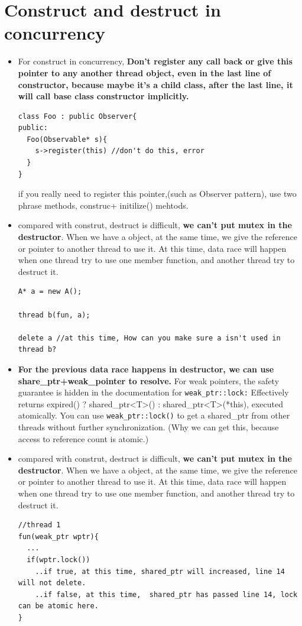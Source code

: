 \documentclass[a4paper,11pt,twoside]{book}
\begin{document}
\section{Construct and destruct in concurrency}
\begin{itemize}

	\item For construct in concurrency, \textbf{Don't register any call back or give this pointer to any another thread object, even in the last line of constructor, because maybe it's a child class, after the last line, it will call base class constructor implicitly.}
\begin{lstlisting}
class Foo : public Observer{
public:
  Foo(Observable* s){
    s->register(this) //don't do this, error
  }
}
\end{lstlisting}
if you really need to register this pointer,(such as Observer pattern),  use two phrase methods, construc+ initilize() mehtods.

    \item compared with construt, destruct is difficult, \textbf{we can't put mutex in the destructor}. When we have a object, at the same time, we give the reference or pointer to another thread to use it. At this time, data race will happen when one thread try to use one member function, and another thread try to destruct it. 
\begin{lstlisting}[]
A* a = new A();

thread b(fun, a);

delete a //at this time, How can you make sure a isn't used in thread b? 
\end{lstlisting}

		\item \textbf{For the previous data race happens in destructor, we can use share\_ptr+weak\_pointer to resolve.} For weak pointers, the safety guarantee is hidden in the documentation for \texttt{weak\_ptr::lock:} Effectively returns expired() ? shared\_ptr<T>() : shared\_ptr<T>(*this), executed atomically.  You can use \texttt{weak\_ptr::lock()} to get a shared\_ptr from other threads without further synchronization. (Why we can get this, because access to reference count is atomic.) 
        
    \item compared with construt, destruct is difficult, \textbf{we can't put mutex in the destructor}. When we have a object, at the same time, we give the reference or pointer to another thread to use it. At this time, data race will happen when one thread try to use one member function, and another thread try to destruct it. 
\begin{lstlisting}[]
//thread 1
fun(weak_ptr wptr){
  ...
  if(wptr.lock())
    ..if true, at this time, shared_ptr will increased, line 14 will not delete.
    ..if false, at this time,  shared_ptr has passed line 14, lock can be atomic here. 
}


\end{lstlisting}
\end{itemize}
\end{document}
